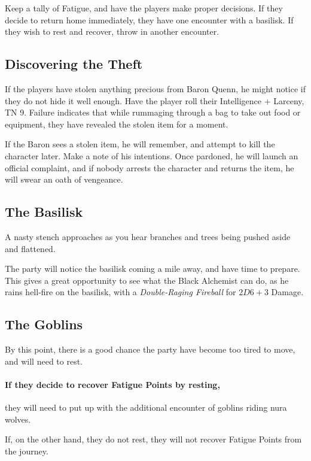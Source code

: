 \begin{multicols}{2}

\noindent
Keep a tally of Fatigue, and have the players make proper decisions.
If they decide to return home immediately, they have one encounter with a basilisk.
If they wish to rest and recover, throw in another encounter.

\subsection{Discovering the Theft}

If the players have stolen anything precious from Baron Quenn, he might notice if they do not hide it well enough.
Have the player roll their Intelligence + Larceny, TN 9.
Failure indicates that while rummaging through a bag to take out food or equipment, they have revealed the stolen item for a moment.

If the Baron sees a stolen item, he will remember, and attempt to kill the character later.
Make a note of his intentions.
Once pardoned, he will launch an official complaint, and if nobody arrests the character and returns the item, he will swear an oath of vengeance.

\subsection{The Basilisk}

\begin{boxtext}

	A nasty stench approaches as you hear branches and trees being pushed aside and flattened.

\end{boxtext}

The party will notice the basilisk coming a mile away, and have time to prepare.
This gives a great opportunity to see what the Black Alchemist can do, as he rains hell-fire on the basilisk, with a \textit{Double-Raging Fireball} for $2D6+3$ Damage.

\basilisk

\subsection{The Goblins}

By this point, there is a good chance the party have become too tired to move, and will need to rest.
\paragraph{If they decide to recover Fatigue Points by resting,}
they will need to put up with the additional encounter of goblins riding nura wolves.



If, on the other hand, they do not rest, they will not recover Fatigue Points from the journey.

\end{multicols}


